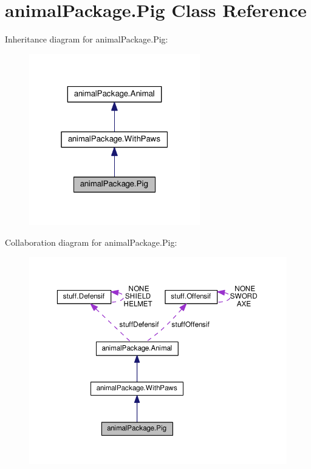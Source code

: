 \hypertarget{classanimal_package_1_1_pig}{}\section{animal\+Package.\+Pig Class Reference}
\label{classanimal_package_1_1_pig}


Inheritance diagram for animal\+Package.\+Pig\+:\nopagebreak
\begin{figure}[H]
\begin{center}
\leavevmode
\includegraphics[width=211pt]{classanimal_package_1_1_pig__inherit__graph}
\end{center}
\end{figure}


Collaboration diagram for animal\+Package.\+Pig\+:\nopagebreak
\begin{figure}[H]
\begin{center}
\leavevmode
\includegraphics[width=350pt]{classanimal_package_1_1_pig__coll__graph}
\end{center}
\end{figure}
